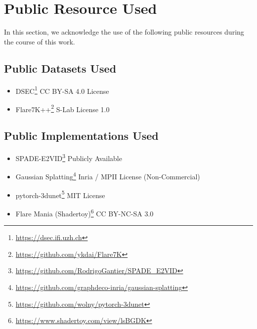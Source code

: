 
\section{Public Resource Used}

In this section, we acknowledge the use of the following public resources during the course of this work.

\subsection{Public Datasets Used}
\begin{itemize}
    \item DSEC\footnote{\url{https://dsec.ifi.uzh.ch}} \dotfill CC BY-SA 4.0 License
    \item Flare7K++\footnote{\url{https://github.com/ykdai/Flare7K}} \dotfill S-Lab License 1.0
\end{itemize}

\subsection{Public Implementations Used}
\begin{itemize}
    \item SPADE-E2VID\footnote{\url{https://github.com/RodrigoGantier/SPADE_E2VID}} \dotfill Publicly Available
    \item Gaussian Splatting\footnote{\url{https://github.com/graphdeco-inria/gaussian-splatting}} \dotfill Inria / MPII License (Non-Commercial)
    \item pytorch-3dunet\footnote{\url{https://github.com/wolny/pytorch-3dunet}} \dotfill MIT License
    \item Flare Mania (Shadertoy)\footnote{\url{https://www.shadertoy.com/view/lsBGDK}} \dotfill CC BY-NC-SA 3.0
\end{itemize}
